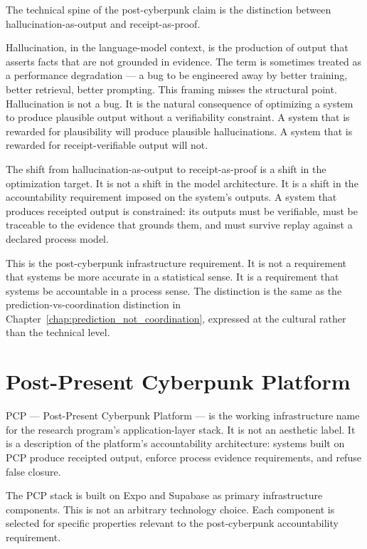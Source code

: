 The technical spine of the post-cyberpunk claim is the distinction between hallucination-as-output and receipt-as-proof.

Hallucination, in the language-model context, is the production of output that asserts facts that are not grounded in evidence. The term is sometimes treated as a performance degradation --- a bug to be engineered away by better training, better retrieval, better prompting. This framing misses the structural point. Hallucination is not a bug. It is the natural consequence of optimizing a system to produce plausible output without a verifiability constraint. A system that is rewarded for plausibility will produce plausible hallucinations. A system that is rewarded for receipt-verifiable output will not.

The shift from hallucination-as-output to receipt-as-proof is a shift in the optimization target. It is not a shift in the model architecture. It is a shift in the accountability requirement imposed on the system's outputs. A system that produces receipted output is constrained: its outputs must be verifiable, must be traceable to the evidence that grounds them, and must survive replay against a declared process model.

This is the post-cyberpunk infrastructure requirement. It is not a requirement that systems be more accurate in a statistical sense. It is a requirement that systems be accountable in a process sense. The distinction is the same as the prediction-vs-coordination distinction in Chapter~\ref{chap:prediction_not_coordination}, expressed at the cultural rather than the technical level.

\section{Post-Present Cyberpunk Platform}

PCP --- Post-Present Cyberpunk Platform --- is the working infrastructure name for the research program's application-layer stack. It is not an aesthetic label. It is a description of the platform's accountability architecture: systems built on PCP produce receipted output, enforce process evidence requirements, and refuse false closure.

The PCP stack is built on Expo and Supabase as primary infrastructure components. This is not an arbitrary technology choice. Each component is selected for specific properties relevant to the post-cyberpunk accountability requirement.

